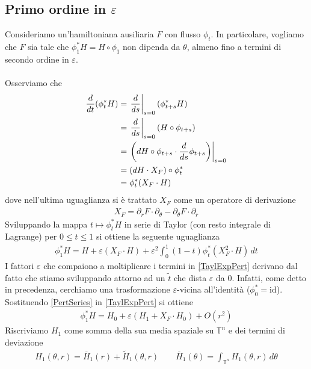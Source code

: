 \documentclass[twoside, 11pt]{amsbook}
\newcommand{\0}{{(0)}}
\newcommand{\3}{{(3)}}
\theoremstyle{colonplain}
\theoremstyle{colondefinition}
\theoremstyle{colonremark}
\numberwithin{equation}{chapter}
\begin{document}
\subsection{Primo ordine in $\varepsilon$} Consideriamo un'hamiltoniana ausiliaria $F$ con flusso $\phi_t$. In particolare, vogliamo che $F$ sia tale che $\phi^*_1H = H \circ \phi_1$ non dipenda da $\theta$, almeno fino a termini di secondo ordine in $\varepsilon$. \\ \\
Osserviamo che
\begin{align}
    \frac{d}{dt}(\phi^*_tH) &= \left.\frac{d}{ds}\right|_{s = 0}(\phi^*_{t + s}H) \notag \\
    &= \left.\frac{d}{ds}\right|_{s = 0}(H \circ \phi_{t + s}) \notag \\
    &= \left.\left(dH \circ \phi_{t + s} \cdot \frac{d}{ds}\phi_{t + s}\right)\right|_{s = 0} \notag \\
    &= (dH \cdot X_F) \circ \phi^*_t \notag \\
    &= \phi^*_t(X_F \cdot H) 
\end{align}
dove nell'ultima uguaglianza si è trattato $X_F$ come un operatore di derivazione
\begin{align}
    X_F = \partial_rF \cdot \partial_\theta - \partial_\theta F \cdot \partial_r 
\end{align}
Sviluppando la mappa $t \mapsto \phi^*_tH$ in serie di Taylor (con resto integrale di Lagrange) per $0 \leq t \leq 1$ si ottiene la seguente uguaglianza
\begin{align}\label{TaylExpPert}
    \phi^*_1H = H + \varepsilon(X_F \cdot H) + \varepsilon^2\int_0^1 (1 - t)\phi^*_t(X^2_F \cdot H) \, dt 
\end{align}
I fattori $\varepsilon$ che compaiono a moltiplicare i termini in \eqref{TaylExpPert} derivano dal fatto che stiamo sviluppando attorno ad un $\tilde{t}$ che dista $\varepsilon$ da $0$. Infatti, come detto in precedenza, cerchiamo una trasformazione $\varepsilon$-vicina all'identità ($\phi^*_0 = \mathrm{id}$). \\
Sostituendo \eqref{PertSeries} in \eqref{TaylExpPert} si ottiene
\begin{align}
    \phi^*_1H = H_0 + \varepsilon(H_1 + X_F \cdot H_0) + O(r^2) 
\end{align}
Riscriviamo $H_1$ come somma della sua media spaziale su $\mathbb{T}^n$ e dei termini di deviazione
\begin{align}
    H_1(\theta, r) = \overline{H}_1(r) + \tilde{H}_1(\theta, r) \qquad \overline{H}_1(\theta) = \int_{\mathbb{T}^n} H_1(\theta, r) \, d\theta 
\end{align}
\end{document}
